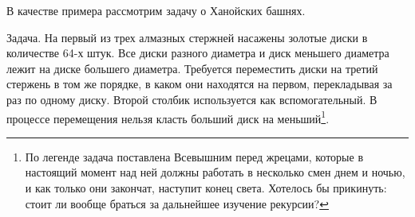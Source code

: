 В качестве примера рассмотрим задачу о Ханойских башнях.
\begin{exampl} 
    Задача. На первый из трех алмазных стержней насажены золотые диски в количестве 64-х штук. Все диски разного диаметра и диск меньшего диаметра лежит на диске большего диаметра. Требуется переместить диски на третий стержень в том же порядке, в каком они находятся на первом, перекладывая за раз по одному диску. Второй столбик используется как вспомогательный. В процессе перемещения нельзя класть больший диск на меньший\footnote{По легенде задача поставлена Всевышним перед жрецами, которые в настоящий момент над ней должны работать в несколько смен днем и ночью, и как только они закончат, наступит конец света. Хотелось бы прикинуть: стоит ли вообще браться за дальнейшее изучение рекурсии?}.
\end{exampl}
